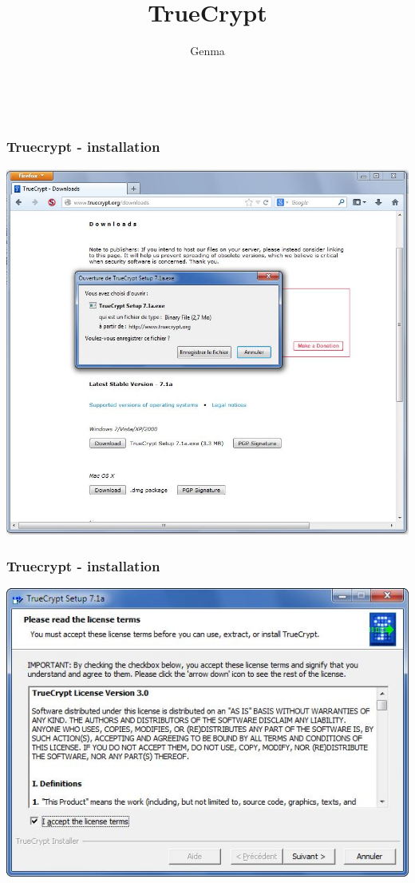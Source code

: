 \documentclass{beamer}
\title[TrueCrypt]{TrueCrypt}
\author{Genma}
\begin{document}
\begin{frame}
	\titlepage
	\vfill
	\begin{center}
		\\[2.5ex]
		{\tiny\CcNote{\CcLongnameByNcSa}}
		\vspace*{-2.5ex}
	\end{center}
\end{frame}


\begin{frame}
\frametitle{Truecrypt - installation}
\begin{center}
\includegraphics[scale=0.5] {./images/Truecrypt_install01.jpg}
\end{center}
\end{frame}
\begin{frame}
\frametitle{Truecrypt - installation}
\begin{center}
\includegraphics[scale=0.5] {./images/Truecrypt_install02.jpg}
\end{center}
\end{frame}
\end{document}
